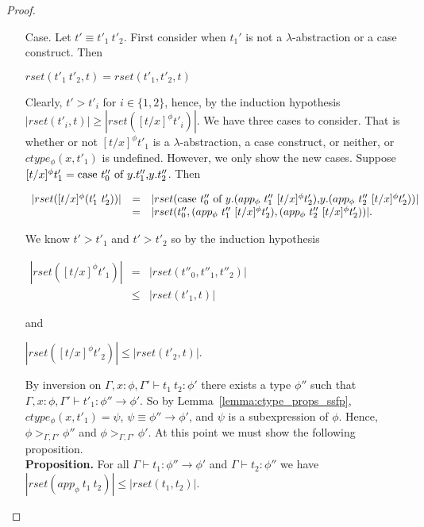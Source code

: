 \begin{proof}
\begin{itemize}
\item[Case.] Let $t' \equiv t'_1\ t'_2$.  First consider when $t_1'$ is not a $\lambda$-abstraction or a case construct. Then
  \begin{center}
    $rset(t'_1\ t'_2, t) = rset(t'_1, t'_2, t)$
  \end{center}  
  Clearly,  $t' > t'_i$ for $i \in \{1,2\}$, hence, by the induction hypothesis $|rset(t'_i,t)| \geq |rset([t/x]^\phi t'_i)|$.  
  We have three cases to consider.  That is whether or not $[t/x]^\phi t'_1$ is a $\lambda$-abstraction, 
  a case construct, or neither, or $ctype_\phi(x,t'_1)$ is undefined. However, we only show the new cases. 
  Suppose $[t/x]^\phi t'_1 = \mbox{case}\ t''_0\ \text{of}\ y\text{.}t''_1\text{,}y\text{.}t''_2$. Then 
  \begin{center}
    \small
    \begin{math}
      \begin{array}{lll}
        |rset([t/x]^\phi (t'_1\ t'_2))| & = & |rset(\ccon{t''_0}{y}{(app_\phi\ t''_1\ [t/x]^\phi t'_2)}{(app_\phi\ t''_2\ [t/x]^\phi t'_2)})|\\
        & = & |rset(t''_0, (app_\phi\ t''_1\ [t/x]^\phi t'_2), (app_\phi\ t''_2\ [t/x]^\phi t'_2))|.
      \end{array}
    \end{math}
  \end{center}
  We know $t' > t'_1$ and $t' > t'_2$ so by the induction hypothesis
  \begin{center}
    \begin{math}
      \begin{array}{lll}
        |rset([t/x]^\phi t'_1)| & =    & |rset(t''_0, t''_1,t''_2)|\\
        & \leq & |rset(t'_1,t)|
      \end{array}
    \end{math}
  \end{center}
  and
  \begin{center}
    \begin{math}
      |rset([t/x]^\phi t'_2)| \leq |rset(t'_2,t)|.
    \end{math}
  \end{center}
  By inversion on $\Gamma,x:\phi,\Gamma' \vdash t_1\ t_2:\phi'$ there exists a type $\phi''$ such that
  $\Gamma,x:\phi,\Gamma' \vdash t'_1:\phi'' \to \phi'$.  So by Lemma~\ref{lemma:ctype_props_ssfp},
  $ctype_\phi(x,t'_1) = \psi$, $\psi \equiv \phi'' \to \phi'$, and $\psi$ is a subexpression of $\phi$.  Hence,
  $\phi >_{\Gamma,\Gamma'} \phi''$ and $\phi >_{\Gamma,\Gamma'} \phi'$.  At this point we must show the following
  proposition.
  \ \\
  {\bf Proposition.}  For all $\Gamma \vdash t_1:\phi'' \to \phi'$ and $\Gamma \vdash t_2:\phi''$ we have \\
  $|rset(app_\phi\ t_1\ t_2)| \leq |rset(t_1,t_2)|$.
  

\end{itemize}
\end{proof}
